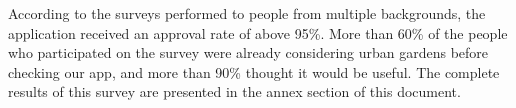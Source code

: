 According to the surveys performed to people from multiple backgrounds, the application received an approval rate of above 95\%. More than 60\% of the people who participated on the survey were already considering urban gardens before checking our app, and more than 90\% thought it would be useful. The complete results of this survey are presented in the annex section of this document.


